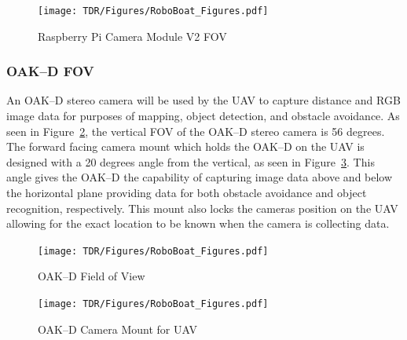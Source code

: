 \documentclass[letterpaper, 12 pt, conference]{ieeeconf}
\begin{document}


\begin{figure}[tb]
\centering
\texttt{[image: TDR/Figures/RoboBoat\_Figures.pdf]}
\caption{Raspberry Pi Camera Module V2 FOV}
\label{fig:picamfov}
\end{figure}

\subsubsection{OAK--D FOV}
% 
An OAK--D stereo camera will be used by the UAV to capture distance and RGB image data for purposes of mapping, object detection, and obstacle avoidance. As seen in Figure~\ref{fig:oakdfov}, the vertical FOV of the OAK--D stereo camera is 56 degrees. The forward facing camera mount which holds the OAK--D on the UAV is designed with a 20 degrees angle from the vertical, as seen in Figure~\ref{fig:cammount}. This angle gives the OAK--D the capability of capturing image data above and below the horizontal plane providing data for both obstacle avoidance and object recognition, respectively. This mount also locks the cameras position on the UAV allowing for the exact location to be known when the camera is collecting data.
%
\begin{figure}[tb]
\centering
\texttt{[image: TDR/Figures/RoboBoat\_Figures.pdf]}
\caption{OAK--D Field of View}
\label{fig:oakdfov}
\end{figure}
%
%
\begin{figure}[tb]
\centering
\texttt{[image: TDR/Figures/RoboBoat\_Figures.pdf]}
\caption{OAK--D Camera Mount for UAV}
\label{fig:cammount}
\end{figure}
%
\end{document}

